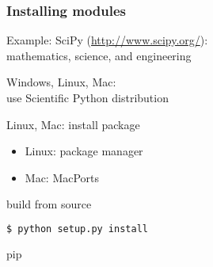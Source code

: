 \begin{frame}[fragile]
\frametitle{Installing modules}

Example: SciPy (\url{http://www.scipy.org/}):\\
mathematics, science, and engineering

\begin{description}
\item<2->[Easy way:] Windows, Linux, Mac:\\
use Scientific Python distribution
\item<3->[Intermediate:] Linux, Mac: install package\\
\begin{itemize}
\item Linux: package manager
\item Mac: MacPorts %
\end{itemize}
\item<4->[Harder:] build from source
\begin{lstlisting}[language=bash]
 $ python setup.py install
\end{lstlisting}
\item<5->[Better:] pip
\end{description}

\end{frame}


